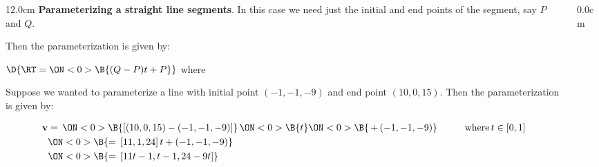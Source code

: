 \begin{frame}
{}
\scriptsize
\begin{columns}
\begin{column}{12.0cm}
{\bf Parameterizing a straight line segments}.  In this case we need just the initial and end points of the segment, say $P$ and $Q$.

\vspace{0.4cm}

Then the parameterization is given by:

\vspace{0.2cm}

\begin{center}
	$\D{\RT = 
	\ON<0>{\B{(Q-P) t + P}}}$ \quad where \quad 
	\ON<0>{\B{$t \in [0,1]$}}
\end{center}

\vspace{0.2cm}

\EX Suppose we wanted to parameterize a line with initial point $(-1,-1,-9)$ and end point $(10,0,15)$.  Then the parameterization is given by: 

\begin{align*}
	{\bf v} 
	&= \, \ON<0>{\B{[(10,0,15)-(-1,-1,-9)]}} \, 
	\ON<0>{\B{t}} 
	\ON<0>{\B{\, + \, (-1,-1,-9)}} \hspace{1.0cm} \text{where} \, t \in [0,1] \\
	&\ON<0>{\B{= \, [11,1,24] \, t + (-1,-1,-9)}} \\
	&\ON<0>{\B{= \, [11t-1,t-1,24-9t]}} \\
\end{align*}

\vspace{2.2cm}

\end{column}
\begin{column}{0.0cm}\end{column}
\end{columns}
\end{frame}


